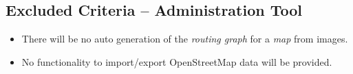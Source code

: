 \subsection{Excluded Criteria -- Administration Tool}

\begin{itemize}
	\item There will be no auto generation of the \textit{routing graph} for a \textit{map} from images.
	\item No functionality to import/export OpenStreetMap data will be provided.
\end{itemize}
